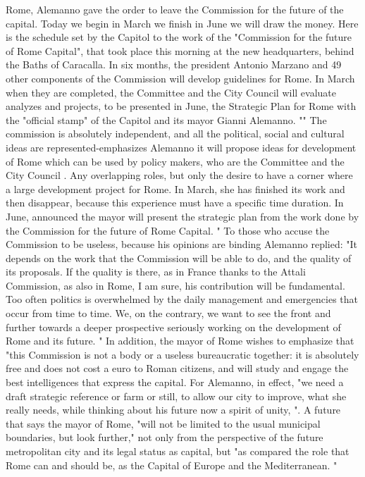 Rome, Alemanno gave the order to leave the Commission for the future of the capital.
Today we begin in March we finish in June we will draw the money.
Here is the schedule set by the Capitol to the work of the "Commission for the future of Rome Capital", that took place this morning at the new headquarters, behind the Baths of Caracalla.
In six months, the president Antonio Marzano and 49 other components of the Commission will develop guidelines for Rome.
In March when they are completed, the Committee and the City Council will evaluate analyzes and projects, to be presented in June, the Strategic Plan for Rome with the "official stamp" of the Capitol and its mayor Gianni Alemanno.
"" The commission is absolutely independent, and all the political, social and cultural ideas are represented-emphasizes Alemanno it will propose ideas for development of Rome which can be used by policy makers, who are the Committee and the City Council .
Any overlapping roles, but only the desire to have a corner where a large development project for Rome.
In March, she has finished its work and then disappear, because this experience must have a specific time duration.
In June, announced the mayor will present the strategic plan from the work done by the Commission for the future of Rome Capital. "
To those who accuse the Commission to be useless, because his opinions are binding Alemanno replied: "It depends on the work that the Commission will be able to do, and the quality of its proposals.
If the quality is there, as in France thanks to the Attali Commission, as also in Rome, I am sure, his contribution will be fundamental.
Too often politics is overwhelmed by the daily management and emergencies that occur from time to time.
We, on the contrary, we want to see the front and further towards a deeper prospective seriously working on the development of Rome and its future. "
In addition, the mayor of Rome wishes to emphasize that "this Commission is not a body or a useless bureaucratic together: it is absolutely free and does not cost a euro to Roman citizens, and will study and engage the best intelligences that express the capital.
For Alemanno, in effect, "we need a draft strategic reference or farm or still, to allow our city to improve, what she really needs, while thinking about his future now a spirit of unity, ".
A future that says the mayor of Rome, "will not be limited to the usual municipal boundaries, but look further," not only from the perspective of the future metropolitan city and its legal status as capital, but "as compared the role that Rome can and should be, as the Capital of Europe and the Mediterranean. "
